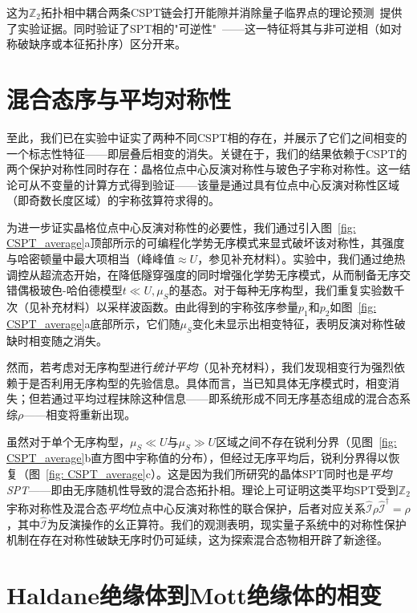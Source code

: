 \documentclass[preprint,superscriptaddress,floatfix, nofootinbib]{revtex4-2}
\begin{document}
这为$\mathbb{Z}_2$拓扑相中耦合两条CSPT链会打开能隙并消除量子临界点的理论预测~\cite{Gu2009}提供了实验证据。同时验证了SPT相的"可逆性"~\cite{Freed2014}——这一特征将其与非可逆相（如对称破缺序或本征拓扑序）区分开来。
\section{混合态序与平均对称性}

至此，我们已在实验中证实了两种不同CSPT相的存在，并展示了它们之间相变的一个标志性特征——即层叠后相变的消失。关键在于，我们的结果依赖于CSPT的两个保护对称性同时存在：晶格位点中心反演对称性与玻色子宇称对称性。这一结论可从不变量的计算方式得到验证——该量是通过具有位点中心反演对称性区域（即奇数长度区域）的宇称弦算符求得的。

为进一步证实晶格位点中心反演对称性的必要性，我们通过引入图~\ref{fig: CSPT_average}a顶部所示的可编程化学势无序模式来显式破坏该对称性，其强度与哈密顿量中最大项相当（峰峰值$\approx U$，参见补充材料）。实验中，我们通过绝热调控从超流态开始，在降低隧穿强度的同时增强化学势无序模式，从而制备无序交错偶极玻色-哈伯德模型$t \ll U, \mu_S$的基态。对于每种无序构型，我们重复实验数千次（见补充材料）以采样波函数。由此得到的宇称弦序参量$p_1$和$p_2$如图~\ref{fig: CSPT_average}a底部所示，它们随$\mu_S$变化未显示出相变特征，表明反演对称性破缺时相变随之消失。

然而，若考虑对无序构型进行\textit{统计平均}（见补充材料），我们发现相变行为强烈依赖于是否利用无序构型的先验信息。具体而言，当已知具体无序模式时，相变消失；但若通过平均过程抹除这种信息——即系统形成不同无序基态组成的混合态系综$\rho$——相变将重新出现\cite{Ma2023}。

虽然对于单个无序构型，$\mu_S \ll U$与$\mu_S \gg U$区域之间不存在锐利分界（见图~\ref{fig: CSPT_average}b直方图中宇称值的分布），但经过无序平均后，锐利分界得以恢复（图~\ref{fig: CSPT_average}c）。这是因为我们所研究的晶体SPT同时也是\textit{平均SPT}——即由无序随机性导致的混合态拓扑相\cite{Fu2012, Ringel12, Mong12, Fulga14, Ma2023, Ma23_b, De2022, Coser2019, Fan2024, Bao2023, Verstraete2009, Diehl2008, Sang2024, Sang2025}。理论上可证明这类平均SPT受到$\mathbb{Z}_2$宇称对称性及混合态\textit{平均}位点中心反演对称性的联合保护，后者对应关系$\hat{\mathcal{I}} \rho \hat{\mathcal{I}}^{\dagger} = \rho$，其中$\hat{\mathcal{I}}$为反演操作的幺正算符。我们的观测表明，现实量子系统中的对称性保护机制在存在对称性破缺无序时仍可延续，这为探索混合态物相开辟了新途径。
\section{Haldane绝缘体到Mott绝缘体的相变 \label{sec:HI}}
\end{document}
